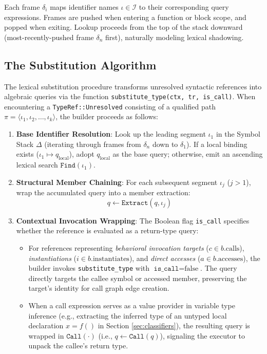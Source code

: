 Each frame $\delta_i$ maps identifier names $\iota \in \mathcal{I}$
to their corresponding
query expressions. Frames are pushed when entering a function or
block scope, and popped when exiting. Lookup proceeds from the top of
the stack downward (most-recently-pushed frame $\delta_n$ first),
naturally modeling
lexical shadowing.

\subsection{The Substitution Algorithm}

The lexical substitution procedure transforms unresolved syntactic
references into
algebraic queries via the function \texttt{substitute\_type(ctx, tr,
is\_call)}. When encountering
a \texttt{TypeRef::Unresolved} consisting of a qualified path $\pi =
\langle \iota_1, \iota_2, \ldots, \iota_k \rangle$,
the builder proceeds as follows:
\begin{enumerate}
  \item \textbf{Base Identifier Resolution}: Look up the leading
    segment $\iota_1$ in the Symbol Stack $\Delta$
    (iterating through frames from $\delta_n$ down to $\delta_1$).
    If a local binding exists ($\iota_1 \mapsto q_{\text{local}}$),
    adopt $q_{\text{local}}$ as the base query;
    otherwise, emit an ascending lexical search $\texttt{Find}(\iota_1)$.
  \item \textbf{Structural Member Chaining}: For each subsequent
    segment $\iota_j$ ($j > 1$), wrap the
    accumulated query into a member extraction:
    $$q \leftarrow \texttt{Extract}(q, \iota_j)$$
  \item \textbf{Contextual Invocation Wrapping}: The Boolean flag
    \texttt{is\_call} specifies whether the
    reference is evaluated as a return-type query:
    \begin{itemize}
      \item For references representing \textit{behavioral invocation
        targets} ($c \in b.\text{calls}$),
        \textit{instantiations} ($i \in b.\text{instantiates}$), and
        \textit{direct accesses}
        ($a \in b.\text{ac}$\-$\text{cesses}$), the builder invokes
        \texttt{substitute\_type} with $\texttt{is\_call} = \text{false}$.
        The query directly targets the callee symbol or accessed
        member, preserving the target's identity
        for call graph edge creation.
      \item When a call expression serves as a value provider in
        variable type inference
        (e.g., extracting the inferred type of an untyped local
          declaration $x = f()$ in
        Section \ref{sec:classifiers}), the resulting query is wrapped
        in $\texttt{Call}(\cdot)$
        (i.e., $q \leftarrow \texttt{Call}(q)$), signaling the
        executor to unpack the callee's return type.
    \end{itemize}
\end{enumerate}

